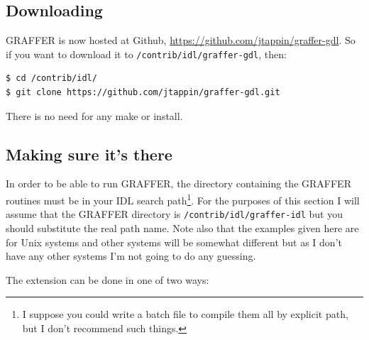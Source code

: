 \documentclass[11pt,twoside,english]{article}
\begin{document}
\subsection{Downloading}
\label{sec:download}

GRAFFER is now hosted at Github,
\url{https://github.com/jtappin/graffer-gdl}.
So if you want to download it to \texttt{/contrib/idl/graffer-gdl},
then:
\begin{verbatim}
$ cd /contrib/idl/
$ git clone https://github.com/jtappin/graffer-gdl.git
\end{verbatim}
There is no need for any make or install.

\subsection{Making sure it's there}

In order to be able to run GRAFFER, the directory containing the
GRAFFER routines must be in your IDL search path\footnote{I suppose you
  could write a batch file to compile them all by explicit path, but I
  don't recommend such things.}. For the purposes of this section I
will assume that the GRAFFER directory is \texttt{/contrib/idl/graffer-idl}
but you should substitute the real path name. Note also that the
examples given here are for Unix systems and other systems will be
somewhat different but as I don't have any other systems I'm not going
to do any guessing.

The extension can be done in one of two ways:
\end{document}
